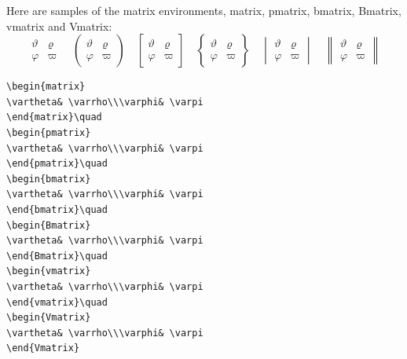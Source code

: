\documentclass{article}
\newcommand{\ntt}{\normalfont\ttfamily}
\newcommand{\cn}[1]{{\protect\ntt\bslash#1}}
\theoremstyle{definition}
\theoremstyle{remark}
\begin{document}
Here are samples of the matrix environments,
\cn{matrix}, \cn{pmatrix}, \cn{bmatrix}, \cn{Bmatrix}, \cn{vmatrix}
and \cn{Vmatrix}:
\begin{equation}
\begin{matrix}
\vartheta& \varrho\\\varphi& \varpi
\end{matrix}\quad
\begin{pmatrix}
\vartheta& \varrho\\\varphi& \varpi
\end{pmatrix}\quad
\begin{bmatrix}
\vartheta& \varrho\\\varphi& \varpi
\end{bmatrix}\quad
\begin{Bmatrix}
\vartheta& \varrho\\\varphi& \varpi
\end{Bmatrix}\quad
\begin{vmatrix}
\vartheta& \varrho\\\varphi& \varpi
\end{vmatrix}\quad
\begin{Vmatrix}
\vartheta& \varrho\\\varphi& \varpi
\end{Vmatrix}
\end{equation}
%
\begin{verbatim}
\begin{matrix}
\vartheta& \varrho\\\varphi& \varpi
\end{matrix}\quad
\begin{pmatrix}
\vartheta& \varrho\\\varphi& \varpi
\end{pmatrix}\quad
\begin{bmatrix}
\vartheta& \varrho\\\varphi& \varpi
\end{bmatrix}\quad
\begin{Bmatrix}
\vartheta& \varrho\\\varphi& \varpi
\end{Bmatrix}\quad
\begin{vmatrix}
\vartheta& \varrho\\\varphi& \varpi
\end{vmatrix}\quad
\begin{Vmatrix}
\vartheta& \varrho\\\varphi& \varpi
\end{Vmatrix}
\end{verbatim}
\end{document}
